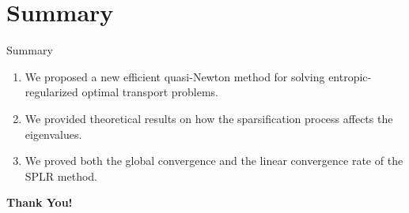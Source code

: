 \section{Summary}
\begin{frame}{Summary}
    \begin{enumerate}
        \item We proposed a new efficient quasi-Newton method for solving entropic-regularized optimal transport problems.
        \item We provided theoretical results on how the sparsification process affects the eigenvalues.
        \item We proved both the global convergence and the linear convergence rate of the SPLR method.
    \end{enumerate}
\end{frame}

\begin{frame}[plain]
  \centering
  \vfill
  {\Huge\bfseries Thank You!}
  \vfill
\end{frame}